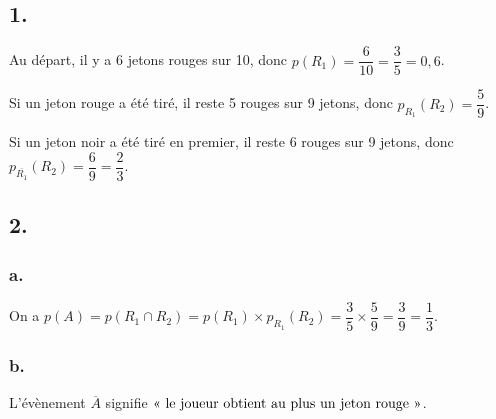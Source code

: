 \subsection*{1.}
	
	Au départ, il y a 6 jetons rouges sur 10, donc \(p(R_1) = \dfrac{6}{10} = \dfrac{3}{5} = 0,6\).
	
	Si un jeton rouge a été tiré, il reste 5 rouges sur 9 jetons, donc \(p_{R_1}(R_2) = \dfrac{5}{9}\).
	
	Si un jeton noir a été tiré en premier, il reste 6 rouges sur 9 jetons, donc \(p_{\overline{R_1}}(R_2) = \dfrac{6}{9} = \dfrac{2}{3}\).
	
	\begin{center}
	\end{center}
	
	\subsection*{2.}
	
	\subsubsection*{a.}
	
	On a \(p(A) = p(R_1 \cap R_2) = p(R_1) \times p_{R_1}(R_2) = \dfrac{3}{5} \times \dfrac{5}{9} = \dfrac{3}{9} = \dfrac{1}{3}\).
	
	\subsubsection*{b.}
	
	L'évènement \(\overline{A}\) signifie \(\text{\guillemotleft{} le joueur obtient au plus un jeton rouge \guillemotright{}}\).
	
